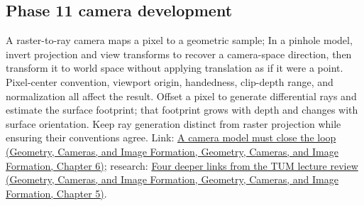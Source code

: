 \subsection{Phase 11 camera development}\label{appendix-1c07d64f5e70-phase-11-camera-development}

A raster-to-ray camera maps a pixel to a geometric sample; In a pinhole model, invert projection and view transforms to recover a camera-space direction, then transform it to world space without applying translation as if it were a point. Pixel-center convention, viewport origin, handedness, clip-depth range, and normalization all affect the result. Offset a pixel to generate differential rays and estimate the surface footprint; that footprint grows with depth and changes with surface orientation. Keep ray generation distinct from raster projection while ensuring their conventions agree. Link: \href{../03-Geometry-Cameras-and-Image-Formation/main.pdf\#nameddest=02-foundations-ii-ch037-a-camera-model-must-close-the-loop}{A camera model must close the loop (Geometry, Cameras, and Image Formation, Geometry, Cameras, and Image Formation, Chapter 6)}; research: \href{../03-Geometry-Cameras-and-Image-Formation/main.pdf\#nameddest=02-foundations-ii-ch036-four-deeper-links-from-the-tum-lecture-review}{Four deeper links from the TUM lecture review (Geometry, Cameras, and Image Formation, Geometry, Cameras, and Image Formation, Chapter 5)}.
